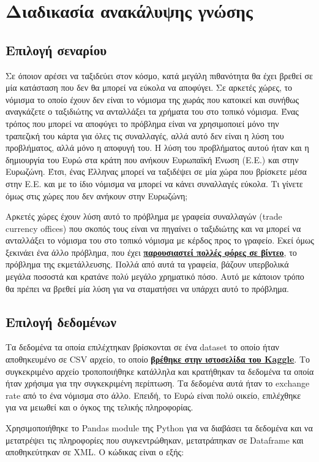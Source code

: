 \label{Chapter1}

\section{Διαδικασία ανακάλυψης γνώσης}

\subsection{Επιλογή σεναρίου}
\label{chap:problem}

Σε όποιον αρέσει να ταξιδεύει στον κόσμο, κατά μεγάλη πιθανότητα θα έχει βρεθεί σε μία κατάσταση που δεν θα μπορεί να εύκολα να αποφύγει. Σε αρκετές χώρες, το νόμισμα το οποίο έχουν δεν είναι το νόμισμα της χωράς που κατοικεί και συνήθως αναγκάζετε ο ταξιδιώτης να ανταλλάξει τα χρήματα του στο τοπικό νόμισμα. Ένας τρόπος που μπορεί να αποφύγει το πρόβλημα είναι να χρησιμοποιεί μόνο την τραπεζική του κάρτα για όλες τις συναλλαγές, αλλά αυτό δεν είναι η λύση του προβλήματος, αλλά μόνο η αποφυγή του. Η λύση του προβλήματος αυτού ήταν και η δημιουργία του Ευρώ στα κράτη που ανήκουν Ευρωπαϊκή Ένωση (Ε.Ε.) και στην Ευρωζώνη. Έτσι, ένας Έλληνας μπορεί να ταξιδέψει σε μία χώρα που βρίσκετε μέσα στην Ε.Ε. και με το ίδιο νόμισμα να μπορεί να κάνει συναλλαγές εύκολα. Τι γίνετε όμως στις χώρες που δεν ανήκουν στην Ευρωζώνη; \par
Αρκετές χώρες έχουν λύση αυτό το πρόβλημα με γραφεία συναλλαγών (trade currency offices) που σκοπός τους είναι να πηγαίνει ο ταξιδιώτης και να μπορεί να ανταλλάξει το νόμισμα του στο τοπικό νόμισμα με κέρδος προς το γραφείο. Εκεί όμως ξεκινάει ένα άλλο πρόβλημα, που έχει \href{https://www.youtube.com/watch?v=6zwiArr3jYE}{\textbf{παρουσιαστεί πολλές φόρες σε βίντεο}}, το πρόβλημα της εκμετάλλευσης. Πολλά από αυτά τα γραφεία, βάζουν υπερβολικά μεγάλα ποσοστά και κρατάνε πολύ μεγάλο χρηματικό πόσο. Αυτό με κάποιον τρόπο θα πρέπει να βρεθεί μία λύση για να σταματήσει να υπάρχει αυτό το πρόβλημα.

\subsection{Επιλογή δεδομένων}

Τα δεδομένα τα οποία επιλέχτηκαν βρίσκονται σε ένα dataset το οποίο ήταν αποθηκευμένο σε CSV αρχείο, το οποίο \href{https://www.kaggle.com/dhruvildave/currency-exchange-rates}{\textbf{βρέθηκε στην ιστοσελίδα του Kaggle}}. Το συγκεκριμένο αρχείο τροποποιήθηκε κατάλληλα και κρατήθηκαν τα δεδομένα τα οποία ήταν χρήσιμα για την συγκεκριμένη περίπτωση. Τα δεδομένα αυτά ήταν το exchange rate από το ένα νόμισμα στο άλλο. Επειδή, το Ευρώ είναι πολύ οικείο, επιλέχθηκε για να μειωθεί και ο όγκος της τελικής πληροφορίας.  \par
Χρησιμοποιήθηκε το Pandas module της Python για να διαβάσει τα δεδομένα και να μετατρέψει τις πληροφορίες που συγκεντρώθηκαν, μετατράπηκαν σε Dataframe και αποθηκεύτηκαν σε XML. Ο κώδικας είναι ο εξής:

